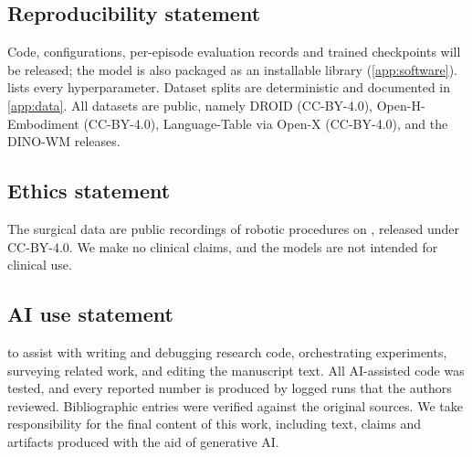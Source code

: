 \subsection*{Reproducibility statement}
Code, configurations, per-episode evaluation records and trained checkpoints will be released; the model is
also packaged as an installable library (\cref{app:software}).
 lists every hyperparameter. Dataset splits are deterministic and documented in
\cref{app:data}. All datasets are public, namely DROID (CC-BY-4.0), Open-H-Embodiment (CC-BY-4.0), Language-Table via Open-X (CC-BY-4.0),  and the DINO-WM releases.

\subsection*{Ethics statement}
The surgical data are public recordings of robotic procedures on ,
released under CC-BY-4.0. We make no clinical claims, and the models are not intended for clinical
use.

\subsection*{AI use statement}
 to assist with writing and debugging research code,
orchestrating experiments, surveying related work, and editing the manuscript text. All
AI-assisted code was tested, and every reported number is produced by logged runs that the authors
reviewed. Bibliographic entries were verified against the original sources. We take responsibility
for the final content of this work, including text, claims and artifacts produced with the aid of
generative AI.
